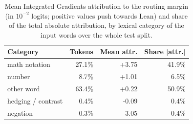 \begin{table}[ht]
\centering
\small
\begin{tabular}{lrrr}
\hline
\textbf{Category} & \textbf{Tokens} & \textbf{Mean attr.} & \textbf{Share $|$attr.$|$} \\
\hline
math notation & 27.1\% & +3.75 & 41.9\% \\
number & 8.7\% & +1.01 & 6.5\% \\
other word & 63.4\% & +0.22 & 50.9\% \\
hedging / contrast & 0.4\% & -0.09 & 0.4\% \\
negation & 0.3\% & -3.05 & 0.4\% \\
\hline
\end{tabular}
\caption{Mean Integrated Gradients attribution to the routing margin (in $10^{-2}$ logits; positive values push towards Lean) and share of the total absolute attribution, by lexical category of the input words over the whole test split.}
\label{tab:ig_categories}
\end{table}
